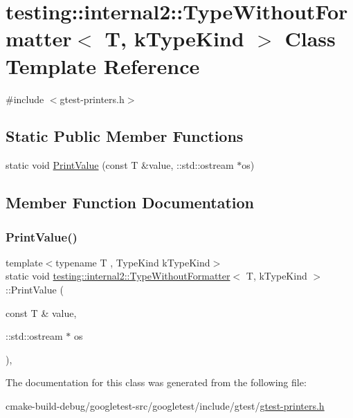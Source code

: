 \hypertarget{classtesting_1_1internal2_1_1TypeWithoutFormatter}{}\section{testing\+::internal2\+::Type\+Without\+Formatter$<$ T, k\+Type\+Kind $>$ Class Template Reference}
\label{classtesting_1_1internal2_1_1TypeWithoutFormatter}


{\ttfamily \#include $<$gtest-\/printers.\+h$>$}

\subsection*{Static Public Member Functions}
\begin{DoxyCompactItemize}
\item 
static void \mbox{\hyperlink{classtesting_1_1internal2_1_1TypeWithoutFormatter_a6651f6f7be2c0f899729eeb6038f76d3}{Print\+Value}} (const T \&value, \+::std\+::ostream $\ast$os)
\end{DoxyCompactItemize}


\subsection{Member Function Documentation}
\mbox{\label{classtesting_1_1internal2_1_1TypeWithoutFormatter_a6651f6f7be2c0f899729eeb6038f76d3}} 
\subsubsection{\texorpdfstring{PrintValue()}{PrintValue()}}
{\footnotesize\ttfamily template$<$typename T , Type\+Kind k\+Type\+Kind$>$ \\
static void \mbox{\hyperlink{classtesting_1_1internal2_1_1TypeWithoutFormatter}{testing\+::internal2\+::\+Type\+Without\+Formatter}}$<$ T, k\+Type\+Kind $>$\+::Print\+Value (\begin{DoxyParamCaption}\item[{const T \&}]{value,  }\item[{\+::std\+::ostream $\ast$}]{os }\end{DoxyParamCaption})\hspace{0.3cm}{\ttfamily [inline]}, {\ttfamily [static]}}



The documentation for this class was generated from the following file\+:\begin{DoxyCompactItemize}
\item 
cmake-\/build-\/debug/googletest-\/src/googletest/include/gtest/\mbox{\hyperlink{gtest-printers_8h}{gtest-\/printers.\+h}}\end{DoxyCompactItemize}

